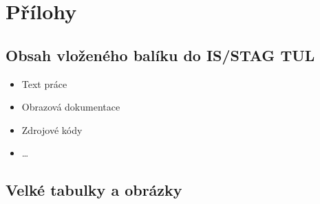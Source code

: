 \documentclass[FM,SP]{tulthesis}
\begin{document}


\renewcommand{\indexname}{Přehled příkazů, prostředí a voleb}
\printindex

\appendix %
\chapter{Přílohy}
\section{Obsah vloženého balíku do IS/STAG TUL} %
\begin{itemize}
    \item Text práce
    \item Obrazová dokumentace
    \item Zdrojové kódy
    \item \dots
\end{itemize}

\section{Velké tabulky a obrázky} %
\end{document}
